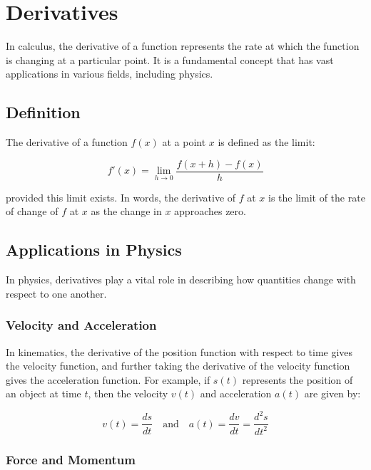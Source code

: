 \chapter{Derivatives}

In calculus, the derivative of a function represents the rate at which the function is changing at a particular point. It is a fundamental concept that has vast applications in various fields, including physics.

\section{Definition}

The derivative of a function $f(x)$ at a point $x$ is defined as the limit:

\begin{equation}
f'(x) = \lim_{{h \to 0}} \frac{f(x+h) - f(x)}{h}
\end{equation}

provided this limit exists. In words, the derivative of $f$ at $x$ is the limit of the rate of change of $f$ at $x$ as the change in $x$ approaches zero.

\section{Applications in Physics}

In physics, derivatives play a vital role in describing how quantities change with respect to one another.

\subsection{Velocity and Acceleration}

In kinematics, the derivative of the position function with respect to time gives the velocity function, and further taking the derivative of the velocity function gives the acceleration function. For example, if $s(t)$ represents the position of an object at time $t$, then the velocity $v(t)$ and acceleration $a(t)$ are given by:

\begin{equation}
v(t) = \frac{ds}{dt} \quad \text{and} \quad a(t) = \frac{dv}{dt} = \frac{d^2s}{dt^2}
\end{equation}

\subsection{Force and Momentum}


